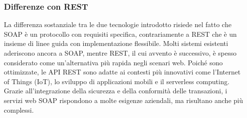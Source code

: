 \subsubsection{Differenze con REST}
La differenza sostanziale tra le due tecnologie introdotto risiede nel fatto che SOAP è un protocollo con requisiti specifica, contrariamente a REST che è un insieme di linee guida con implementazione flessibile. Molti sistemi esistenti aderiscono ancora a SOAP, mentre REST, il cui avvento è successivo, è spesso considerato come un'alternativa più rapida negli scenari web. Poiché sono ottimizzate, le API REST sono adatte ai contesti più innovativi come l'Internet of Things (IoT), lo sviluppo di applicazioni mobili e il serverless computing. Grazie all'integrazione della sicurezza e della conformità delle transazioni, i servizi web SOAP rispondono a molte esigenze aziendali, ma risultano anche più complessi.